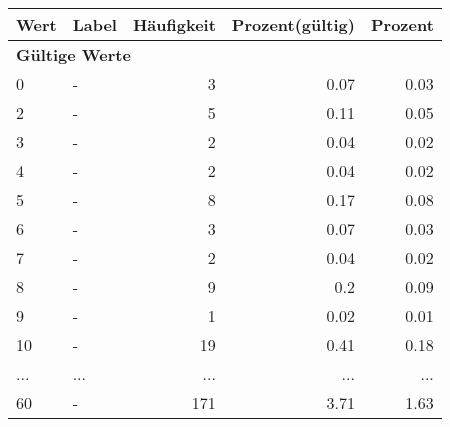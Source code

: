      \begin{longtable}{lXrrr}
     \toprule
     \textbf{Wert} & \textbf{Label} & \textbf{Häufigkeit} & \textbf{Prozent(gültig)} & \textbf{Prozent} \\
     \endhead
     \midrule
     \multicolumn{5}{l}{\textbf{Gültige Werte}}\\
        0 & \multicolumn{1}{X}{-} & %
          \num{3} &
          \num[round-mode=places,round-precision=2]{0.07} &
          \num[round-mode=places,round-precision=2]{0.03} \\
        2 & \multicolumn{1}{X}{-} & %
          \num{5} &
          \num[round-mode=places,round-precision=2]{0.11} &
          \num[round-mode=places,round-precision=2]{0.05} \\
        3 & \multicolumn{1}{X}{-} & %
          \num{2} &
          \num[round-mode=places,round-precision=2]{0.04} &
          \num[round-mode=places,round-precision=2]{0.02} \\
        4 & \multicolumn{1}{X}{-} & %
          \num{2} &
          \num[round-mode=places,round-precision=2]{0.04} &
          \num[round-mode=places,round-precision=2]{0.02} \\
        5 & \multicolumn{1}{X}{-} & %
          \num{8} &
          \num[round-mode=places,round-precision=2]{0.17} &
          \num[round-mode=places,round-precision=2]{0.08} \\
        6 & \multicolumn{1}{X}{-} & %
          \num{3} &
          \num[round-mode=places,round-precision=2]{0.07} &
          \num[round-mode=places,round-precision=2]{0.03} \\
        7 & \multicolumn{1}{X}{-} & %
          \num{2} &
          \num[round-mode=places,round-precision=2]{0.04} &
          \num[round-mode=places,round-precision=2]{0.02} \\
        8 & \multicolumn{1}{X}{-} & %
          \num{9} &
          \num[round-mode=places,round-precision=2]{0.2} &
          \num[round-mode=places,round-precision=2]{0.09} \\
        9 & \multicolumn{1}{X}{-} & %
          \num{1} &
          \num[round-mode=places,round-precision=2]{0.02} &
          \num[round-mode=places,round-precision=2]{0.01} \\
        10 & \multicolumn{1}{X}{-} & %
          \num{19} &
          \num[round-mode=places,round-precision=2]{0.41} &
          \num[round-mode=places,round-precision=2]{0.18} \\
       ... & ... & ... & ... & ... \\
        60 & \multicolumn{1}{X}{-} & %
          \num{171} &
          \num[round-mode=places,round-precision=2]{3.71} &
          \num[round-mode=places,round-precision=2]{1.63} \\


\end{longtable}
